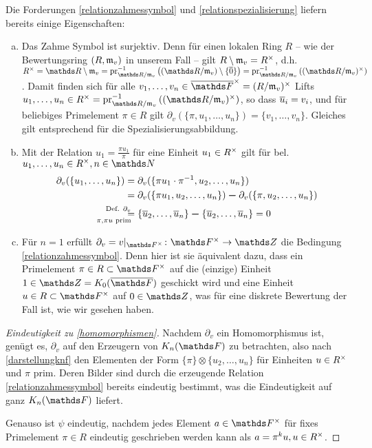 \documentclass[ngerman,fontsize=11pt, paper=a4, parskip=half, titlepage=true, toc=bib]{scrartcl}
\begin{document}
\begin{Bem}\label{bemhomomorphismen}
  Die Forderungen \ref{relationzahmessymbol} und
  \ref{relationspezialisierung} liefern bereits einige Eigenschaften:
  \begin{enumerate}[a)]
  \item Das Zahme Symbol ist surjektiv. 
    Denn für einen lokalen Ring
    $R$ – wie der Bewertungsring $(R,\mathfrak{m}_v)$ in unserem Fall –
    gilt $R\setminus\mathfrak{m}_v=R^\times$, d.h. $\Rx=\R\setminus\frakm_v
    =\pr_{\R/\frakm_v}^{-1}\left((\R/\frakm_v)\setminus \{\ov0\}\right)
    =\pr_{\R/\frakm_v}^{-1}\left( (\R/\frakm_v)^\times\right)$. 
    Damit finden sich für alle 
    $v_1,\dotsc,v_n\in \bFx = (R/\frakm_v)^\times$
    Lifts $u_1,\dotsc, u_n\in\Rx    
    =\pr_{\R/\frakm_v}^{-1}\left( (\R/\frakm_v)^\times \right)$,
    so dass $\overline u_i=v_i$, 
    und für beliebiges Primelement $\pi\in R$ gilt
    $\partial_v(\{\pi,u_1,\dotsc, u_n\})=\{v_1,\dotsc, v_n\}$.
    Gleiches gilt entsprechend für die Spezialisierungsabbildung.
  \item   Mit der Relation $u_1=\frac{\pi u_1}{\pi}$
    für eine Einheit $u_1\in R^\times$
    gilt für bel. $u_1,\dotsc, u_n\in \Rx, n\in\N$
    \begin{align*}
      \partial_v(\{u_1,\dotsc,u_n\})
      &= \partial_v(\{\pi u_1\cdot \pi^{-1},u_2,\dotsc,u_n\})\\
      &= \partial_v(\{\pi u_1,u_2,\dotsc,u_n\})\m 
        \partial_v(\{\pi,u_2,\dotsc,u_n\})\\
      &\overset{\mathllap{\text{Def. }\partial_v}}{
        \underset{\mathllap{\pi,\pi u\text{ prim}}}{=}}
        \{\ov u_2,\dotsc, \ov u_n\} \m \{\ov u_2,\dotsc, \ov u_n\}
        = 0
    \end{align*}
  \item Für $n=1$ erfüllt $\partial_v=v|_{\Fx}\colon \Fx\to \Z$ 
    die Bedingung \ref{relationzahmessymbol}.
    Denn hier ist sie äquivalent dazu, dass ein Primelement 
    $\pi\in R\subset \Fx$ auf die (einzige) Einheit $1\in\Z=\K_0(\bF)$ 
    geschickt wird und eine Einheit $u\in R\subset \Fx$ auf $0\in\Z$,
    was für eine diskrete Bewertung der Fall ist, wie wir gesehen haben.
  \end{enumerate}
\end{Bem}

\begin{proof}[Eindeutigkeit zu \ref{homomorphismen}]
  Nachdem $\partial_v$ ein Homomorphismus ist, genügt es, $\partial_v$ auf
  den Erzeugern von $\KnF$ zu betrachten, also nach \ref{darstellungknf} den
  Elementen der Form $\{\pi\}\otimes\{u_{2},\dotsc,u_{n}\}$ für
  Einheiten $u\in R^\times$ und $\pi$ prim.
  Deren Bilder sind durch die erzeugende Relation 
  \ref{relationzahmessymbol} bereits eindeutig
  bestimmt, was die Eindeutigkeit auf ganz $\KnF$ liefert.
  
  Genauso ist $\psi$ eindeutig, nachdem jedes Element $a\in\Fx$ für
  fixes Primelement $\pi\in R$ eindeutig geschrieben werden kann als
  $a=\pi^k u, u\in R^\times$.
\end{proof}
\end{document}
